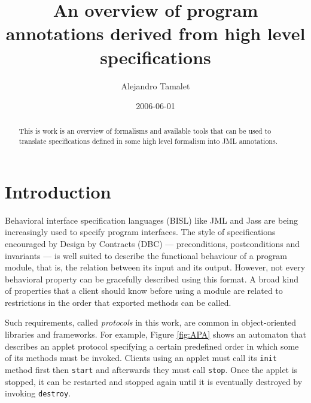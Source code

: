 \documentclass[a4paper,10pt]{article}
\title{An overview of program annotations derived from high level
specifications}
\author{Alejandro Tamalet}
\date{2006-06-01}
\begin{document}
\maketitle


\begin{abstract}
  This is work is an overview of formalisms and available tools that can be used
to translate specifications defined in some high level formalism into JML
annotations.
  
\end{abstract}

\section{Introduction}
Behavioral interface specification languages (BISL) like JML and Jass are being
increasingly used to specify program interfaces. 
The style of specifications encouraged by Design by Contracts (DBC) ---
preconditions, postconditions and invariants --- is well suited to describe the
functional behaviour of a program module, that is, the relation between its
input and its output.
However, not every behavioral property can be gracefully described using this
format. A broad kind of properties that a client should know before using a
module are related to restrictions in the order that exported methods can 
be called.

Such requirements, called \textit{protocols} in this work, are common in
object-oriented libraries and frameworks. For example, Figure \ref{fig:APA}
shows an automaton that describes an applet protocol specifying a certain
predefined order in which some of its methods must be invoked. Clients using an
applet must call its \texttt{init} method first then \texttt{start} and
afterwards they must call \texttt{stop}. Once the applet is stopped, it can be
restarted and stopped again until it is eventually destroyed by invoking
\texttt{destroy}.
\end{document}
